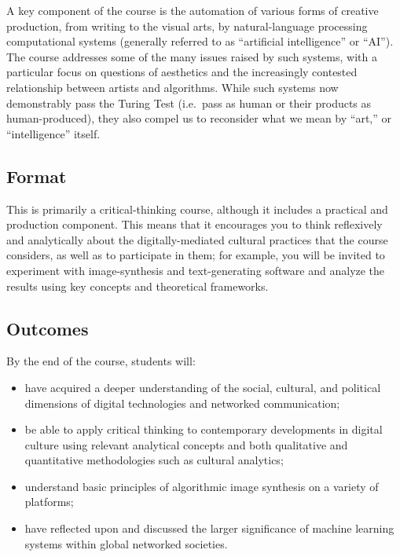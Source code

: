 \documentclass[
  letterpaper,
  DIV=11,
  numbers=noendperiod]{scrartcl}
\providecommand{\tightlist}{%
  \setlength{\itemsep}{0pt}\setlength{\parskip}{0pt}}
\begin{document}
A key component of the course is the automation of various forms of
creative production, from writing to the visual arts, by
natural-language processing computational systems (generally referred to
as ``artificial intelligence'' or ``AI''). The course addresses some of
the many issues raised by such systems, with a particular focus on
questions of aesthetics and the increasingly contested relationship
between artists and algorithms. While such systems now demonstrably pass
the Turing Test (i.e.~pass as human or their products as
human-produced), they also compel us to reconsider what we mean by
``art,'' or ``intelligence'' itself.

\subsection{Format}\label{format}

This is primarily a critical-thinking course, although it includes a
practical and production component. This means that it encourages you to
think reflexively and analytically about the digitally-mediated cultural
practices that the course considers, as well as to participate in them;
for example, you will be invited to experiment with image-synthesis and
text-generating software and analyze the results using key concepts and
theoretical frameworks.

\subsection{Outcomes}\label{outcomes}

By the end of the course, students will:

\begin{itemize}
\tightlist
\item
  have acquired a deeper understanding of the social, cultural, and
  political dimensions of digital technologies and networked
  communication;
\item
  be able to apply critical thinking to contemporary developments in
  digital culture using relevant analytical concepts and both
  qualitative and quantitative methodologies such as cultural analytics;
\item
  understand basic principles of algorithmic image synthesis on a
  variety of platforms;
\item
  have reflected upon and discussed the larger significance of machine
  learning systems within global networked societies.
\end{itemize}
\end{document}

